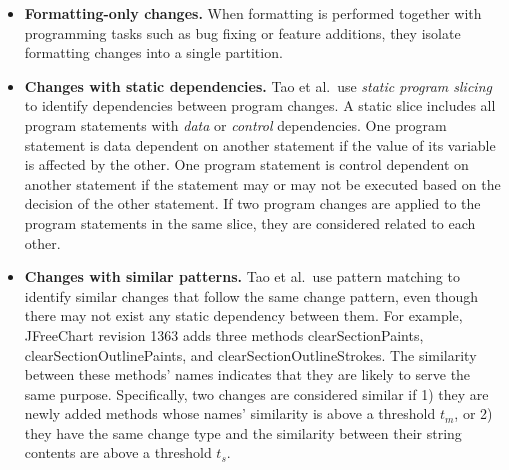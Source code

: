 \documentclass[11pt]{article}
\begin{document}
\begin{itemize}
\item {\bf Formatting-only changes.} When formatting is performed together with programming tasks such as bug fixing or feature additions, they isolate formatting changes into a single partition.
\item {\bf Changes with static dependencies.} Tao et al.~use {\em static program slicing}~\cite{weiser1981program} to identify dependencies between program changes. A static slice includes all program statements with {\em data} or {\em control} dependencies. One program statement is data dependent on another statement if the value of its variable is affected by the other. One program statement is control dependent on another statement if the statement may or may not be executed based on the decision of the other statement. If two program changes are applied to the program statements in the same slice, they are considered related to each other.
\item {\bf Changes with similar patterns.} Tao et al.~use pattern matching to identify similar changes that follow the same change pattern, even though there may not exist any static dependency between them. For example, JFreeChart revision 1363 adds three methods {\ttt clearSectionPaints}, {\ttt clearSectionOutlinePaints}, and {\ttt clearSectionOutlineStrokes}. The similarity between these methods' names indicates that they are likely to serve the same purpose. Specifically, two changes are considered similar if 1) they are newly added methods whose names’ similarity is above a threshold $t_m$, or 2) they have the same change type and the similarity between their string contents are above a threshold $t_s$.
\end{itemize}



\end{document}
